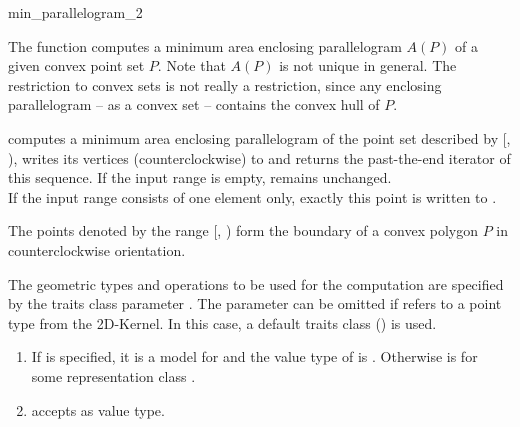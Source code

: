 \begin{ccRefFunction}{min_parallelogram_2}
  
  \ccDefinition The function computes a minimum area enclosing
  parallelogram $A(P)$ of a given convex point set $P$.  Note that
  $A(P)$ is not unique in general.  The restriction to convex sets is
  not really a restriction, since any enclosing parallelogram -- as a
  convex set -- contains the convex hull of $P$.


  \def\ccLongParamLayout{\ccTrue} 
  
  
  computes a minimum area enclosing parallelogram of the point set
  described by [, ), writes its
  vertices (counterclockwise) to  and returns the past-the-end
  iterator of this sequence.
  If the input range is empty,  remains unchanged.\\
  If the input range consists of one element only,
  exactly this point is written to .
  
  \ccPrecond The points denoted by the range [,
  ) form the boundary of a convex polygon $P$ in
  counterclockwise orientation.

  The geometric types and operations to be used for the computation
  are specified by the traits class parameter . The parameter
  can be omitted if  refers to a point type from
  the 2D-Kernel. In this case, a default traits class
  () is used.
  
  \ccRequire
  \begin{enumerate}
  \item If  is specified, it is a model for
     and the value type  of
     is .  Otherwise
     is  for some representation class
    .
  \item {} accepts  as value type.
  \end{enumerate}
  
  \ccSeeAlso
  \\
  \\
  \\


\end{ccRefFunction}
